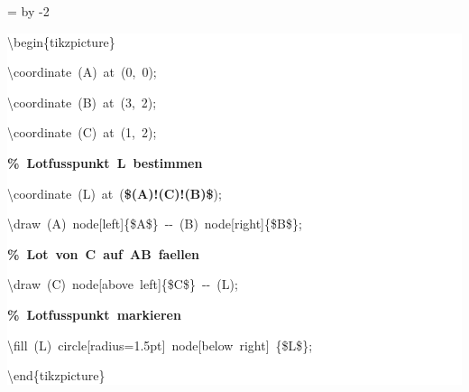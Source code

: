\begingroup
\ttfamily
{}
=\textwidth
\advance{} by -2\fboxsep
\noindent
\colorbox{background}
{%
\parbox{\dimen255}
{%
\rule[-0.5ex]{0pt}{2.5ex}\hspace*{0.0em}\textbackslash{}begin\{tikzpicture\}\\
\rule[-0.5ex]{0pt}{2.5ex}\hspace*{1.0em}\textbackslash{}coordinate~(A)~at~(0,~0);\\
\rule[-0.5ex]{0pt}{2.5ex}\hspace*{1.0em}\textbackslash{}coordinate~(B)~at~(3,~2);\\
\rule[-0.5ex]{0pt}{2.5ex}\hspace*{1.0em}\textbackslash{}coordinate~(C)~at~(1,~2);\\
\rule[-0.5ex]{0pt}{2.5ex}\hspace*{1.0em}\textcolor{G}{\textbf{\%~Lotfusspunkt~L~bestimmen}}\\
\rule[-0.5ex]{0pt}{2.5ex}\hspace*{1.0em}\textbackslash{}coordinate~(L)~at~(\textcolor{R}{\textbf{\$(A)!(C)!(B)\$}});\\
\rule[-0.5ex]{0pt}{2.5ex}\hspace*{1.0em}\textbackslash{}draw~(A)~node[left]\{\$A\$\}~{-}{-}~(B)~node[right]\{\$B\$\};\\
\rule[-0.5ex]{0pt}{2.5ex}\hspace*{1.0em}\textcolor{G}{\textbf{\%~Lot~von~C~auf~AB~faellen}}\\
\rule[-0.5ex]{0pt}{2.5ex}\hspace*{1.0em}\textbackslash{}draw~(C)~node[above~left]\{\$C\$\}~{-}{-}~(L);\\
\rule[-0.5ex]{0pt}{2.5ex}\hspace*{1.0em}\textcolor{G}{\textbf{\%~Lotfusspunkt~markieren}}\\
\rule[-0.5ex]{0pt}{2.5ex}\hspace*{1.0em}\textbackslash{}fill~(L)~circle[radius=1.5pt]~node[below~right]~\{\$L\$\};\\
\rule[-0.5ex]{0pt}{2.5ex}\hspace*{0.0em}\textbackslash{}end\{tikzpicture\}}%
}%
\endgroup
